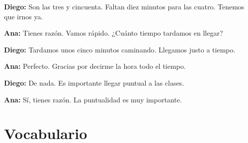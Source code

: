 \documentclass[12pt,a4paper]{article}
\begin{document}
\textbf{Diego:} Son las tres y cincuenta. Faltan diez minutos para las cuatro. Tenemos que irnos ya.

\textbf{Ana:} Tienes razón. Vamos rápido. ¿Cuánto tiempo tardamos en llegar?

\textbf{Diego:} Tardamos unos cinco minutos caminando. Llegamos justo a tiempo.

\textbf{Ana:} Perfecto. Gracias por decirme la hora todo el tiempo.

\textbf{Diego:} De nada. Es importante llegar puntual a las clases.

\textbf{Ana:} Sí, tienes razón. La puntualidad es muy importante.

\newpage

\section*{Vocabulario}
\end{document}
